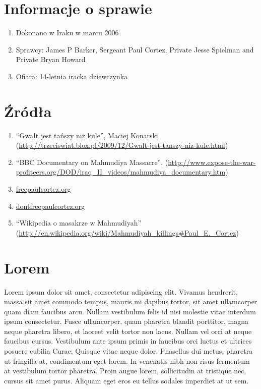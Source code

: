 \documentclass[12pt,a4paper]{article}
\begin{document}
\section{Informacje o sprawie}

\begin{enumerate}
\item Dokonano w Iraku w marcu 2006
\item Sprawcy: James P Barker, Sergeant Paul Cortez, Private Jesse Spielman and Private Bryan Howard
\item Ofiara: 14-letnia iracka dziewczynka
\end{enumerate}

\section{Źródła}


\begin{enumerate}
\item ``Gwałt jest tańszy niż kule'', Maciej Konarski (\url{http://trzeciswiat.blox.pl/2009/12/Gwalt-jest-tanszy-niz-kule.html})
\item ``BBC Documentary on Mahmudiya Massacre'',
  (\url{http://www.expose-the-war-profiteers.org/DOD/iraq_II_videos/mahmudiya_documentary.htm})
\item \url{freepaulcortez.org}
\item \url{dontfreepaulcortez.org}
\item ``Wikipedia o masakrze w Mahmudiyah'' (\url{http://en.wikipedia.org/wiki/Mahmudiyah_killings#Paul_E._Cortez})
\end{enumerate}

\section{Lorem}

Lorem ipsum dolor sit amet, consectetur adipiscing elit. Vivamus
hendrerit, massa sit amet commodo tempus, mauris mi dapibus tortor,
sit amet ullamcorper quam diam faucibus arcu. Nullam vestibulum felis
id nisi molestie vitae interdum ipsum consectetur. Fusce ullamcorper,
quam pharetra blandit porttitor, magna neque pharetra libero, et
laoreet velit tortor non lacus. Nullam vel orci at neque faucibus
cursus. Vestibulum ante ipsum primis in faucibus orci luctus et
ultrices posuere cubilia Curae; Quisque vitae neque dolor. Phasellus
dui metus, pharetra ut fringilla at, condimentum eget lorem. In
venenatis nibh non risus fermentum at vestibulum tortor pharetra.
Proin augue lorem, sollicitudin at tristique nec, cursus sit amet
purus. Aliquam eget eros eu tellus sodales imperdiet at ut sem.
\end{document}
